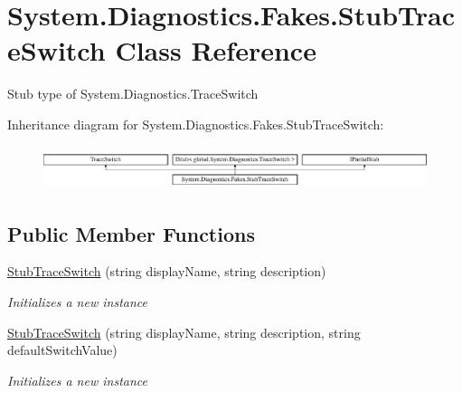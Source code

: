 \hypertarget{class_system_1_1_diagnostics_1_1_fakes_1_1_stub_trace_switch}{\section{System.\-Diagnostics.\-Fakes.\-Stub\-Trace\-Switch Class Reference}
\label{class_system_1_1_diagnostics_1_1_fakes_1_1_stub_trace_switch}
}


Stub type of System.\-Diagnostics.\-Trace\-Switch 


Inheritance diagram for System.\-Diagnostics.\-Fakes.\-Stub\-Trace\-Switch\-:\begin{figure}[H]
\begin{center}
\leavevmode
\includegraphics[height=1.274175cm]{class_system_1_1_diagnostics_1_1_fakes_1_1_stub_trace_switch}
\end{center}
\end{figure}
\subsection*{Public Member Functions}
\begin{DoxyCompactItemize}
\item 
\hyperlink{class_system_1_1_diagnostics_1_1_fakes_1_1_stub_trace_switch_acfe2610fe385e058fc0cf51be18ea10f}{Stub\-Trace\-Switch} (string display\-Name, string description)
\begin{DoxyCompactList}\small\item\em Initializes a new instance\end{DoxyCompactList}\item 
\hyperlink{class_system_1_1_diagnostics_1_1_fakes_1_1_stub_trace_switch_af67c2ae73f92b027e4855128baa3facf}{Stub\-Trace\-Switch} (string display\-Name, string description, string default\-Switch\-Value)
\begin{DoxyCompactList}\small\item\em Initializes a new instance\end{DoxyCompactList}\end{DoxyCompactItemize}
